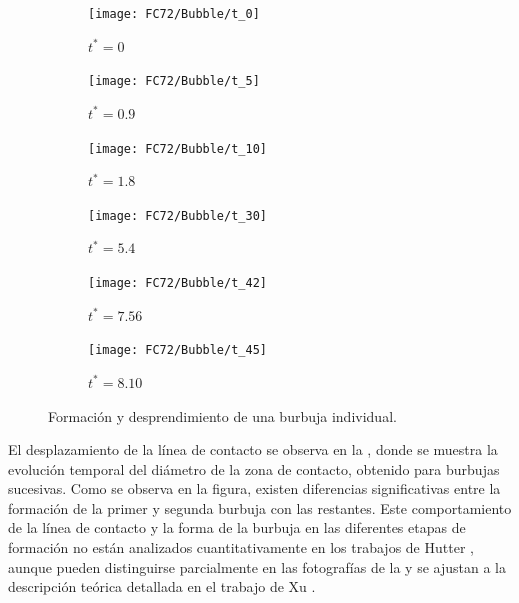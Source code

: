 \begin{figure}[htb]
    \centering
    \begin{subfigure}[t]{0.45\textwidth}
        \centering
        \texttt{[image: FC72/Bubble/t\_0]}
        \caption{$t^*=0$}
    \end{subfigure}
    \vspace{3mm}
    \begin{subfigure}[t]{0.45\textwidth}
        \centering
        \texttt{[image: FC72/Bubble/t\_5]}
        \caption{$t^*=0.9$}
    \end{subfigure}
    \begin{subfigure}[t]{0.45\textwidth}
        \centering
        \texttt{[image: FC72/Bubble/t\_10]}
        \caption{$t^*=1.8$}
    \end{subfigure}
    \vspace{3mm}    
    \begin{subfigure}[t]{0.45\textwidth}
        \centering
        \texttt{[image: FC72/Bubble/t\_30]}
        \caption{$t^*=5.4$}
    \end{subfigure}
    \begin{subfigure}[t]{0.45\textwidth}
        \centering
        \texttt{[image: FC72/Bubble/t\_42]}
        \caption{$t^*=7.56$}
    \end{subfigure}
    \begin{subfigure}[t]{0.45\textwidth}
        \centering
        \texttt{[image: FC72/Bubble/t\_45]}
        \caption{$t^*=8.10$}
    \end{subfigure}            
    \caption{Formaci\'on y desprendimiento de una burbuja individual.}
    \label{fig:burbuja_nu_11}
\end{figure}
\FloatBarrier

El desplazamiento de la l\'inea de contacto se observa en la , donde se muestra la evoluci\'on temporal del di\'ametro de la zona de contacto, obtenido para burbujas sucesivas. Como se observa en la figura, existen diferencias significativas entre la formaci\'on de la primer y segunda burbuja con las restantes. Este comportamiento de la l\'inea de contacto y la forma de la burbuja en las diferentes etapas de formaci\'on no est\'an analizados cuantitativamente en los trabajos de Hutter \cite{hutter_experimental_2009, hutter_experimental_2010}, aunque pueden distinguirse parcialmente en las fotograf\'ias de la  y se ajustan a la descripci\'on te\'orica detallada en el trabajo de Xu \cite{xu_single-bubble_2014}.

